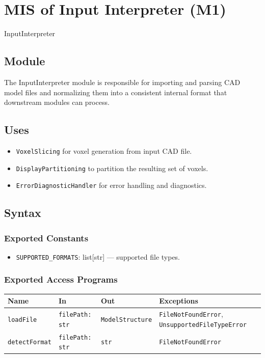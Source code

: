 \documentclass[12pt, titlepage]{article}
\begin{document}
\section{MIS of Input Interpreter (M1)}\label{Module1}

InputInterpreter

\subsection{Module}
The InputInterpreter module is responsible for importing and parsing CAD model files and normalizing them into a consistent internal format that downstream modules can process.

\subsection{Uses}
\begin{itemize}
  \item \texttt{VoxelSlicing} for voxel generation from input CAD file.
  \item \texttt{DisplayPartitioning} to partition the resulting set of voxels.
  \item \texttt{ErrorDiagnosticHandler} for error handling and diagnostics.
\end{itemize}

\subsection{Syntax}

\subsubsection{Exported Constants}
\begin{itemize}
  \item \texttt{SUPPORTED\_FORMATS}: list[str] — supported file types.
\end{itemize}

\subsubsection{Exported Access Programs}
\begin{center}
\renewcommand{\arraystretch}{1.3}
\begin{tabular}{p{3.5cm} p{4.5cm} p{3.5cm} p{3.5cm}}
\toprule
\textbf{Name} & \textbf{In} & \textbf{Out} & \textbf{Exceptions} \\
\midrule
\texttt{loadFile} & \texttt{filePath: str} & \texttt{ModelStructure} & \texttt{FileNotFoundError}, \texttt{UnsupportedFileTypeError} \\
\texttt{detectFormat} & \texttt{filePath: str} & \texttt{str} & \texttt{FileNotFoundError} \\
\bottomrule
\end{tabular}
\end{center}
\end{document}
